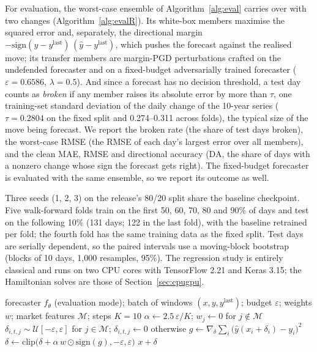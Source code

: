 \documentclass[conference]{IEEEtran}
\newcommand{\sig}{\mathrm{sign}}
\begin{document}
For evaluation, the worst-case ensemble of Algorithm~\ref{alg:eval} carries over with two changes (Algorithm~\ref{alg:evalR}). Its white-box members maximise the squared error and, separately, the directional margin $-\mathrm{sign}(y-y^{\mathrm{last}})\,(\hat y-y^{\mathrm{last}})$, which pushes the forecast against the realised move; its transfer members are margin-PGD perturbations crafted on the undefended forecaster and on a fixed-budget adversarially trained forecaster ($\varepsilon{=}0.6586$, $\lambda{=}0.5$). And since a forecast has no decision threshold, a test day counts as \emph{broken} if any member raises its absolute error by more than $\tau$, one training-set standard deviation of the daily change of the 10-year series ($\tau{=}0.2804$ on the fixed split and 0.274--0.311 across folds), the typical size of the move being forecast. We report the broken rate (the share of test days broken), the worst-case RMSE (the RMSE of each day's largest error over all members), and the clean MAE, RMSE and directional accuracy (DA, the share of days with a nonzero change whose sign the forecast gets right). The fixed-budget forecaster is evaluated with the same ensemble, so we report its outcome as well.

Three seeds (1, 2, 3) on the release's 80/20 split share the baseline checkpoint. Five walk-forward folds train on the first 50, 60, 70, 80 and 90\% of days and test on the following 10\% (131 days; 122 in the last fold), with the baseline retrained per fold; the fourth fold has the same training data as the fixed split. Test days are serially dependent, so the paired intervals use a moving-block bootstrap (blocks of 10 days, 1,000 resamples, 95\%). The regression study is entirely classical and runs on two CPU cores with TensorFlow 2.21 and Keras 3.15; the Hamiltonian solves are those of Section~\ref{sec:cpugpu}.

\begin{algorithm}[t]
\caption{In-loop attacker best response (Study~A, regression): weighted $L_\infty$ PGD on market features}\label{alg:pgdR}
\small
\begin{algorithmic}[1]
\Require forecaster $f_\theta$ (evaluation mode); batch of windows $(x,y,y^{\mathrm{last}})$; budget $\varepsilon$; weights $w$; market features $\mathcal M$; steps $K=10$
\State $\alpha\gets2.5\,\varepsilon/K$; $w_j\gets0$ for $j\notin\mathcal M$
\State $\delta_{i,t,j}\sim\mathcal U[-\varepsilon,\varepsilon]$ for $j\in\mathcal M$; $\delta_{i,t,j}\gets0$ otherwise
  \State $g\gets\nabla_\delta\sum_i\big(\hat y(x_i+\delta_i)-y_i\big)^2$ 
  \State $\delta\gets\mathrm{clip}\big(\delta+\alpha\,w\odot\sig(g),-\varepsilon,\varepsilon\big)$ 
\EndFor
\State \Return $x+\delta$
\end{algorithmic}
\end{algorithm}
\end{document}
